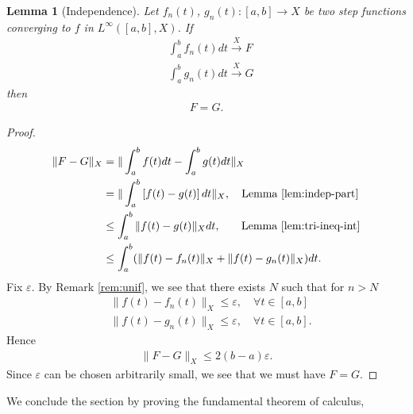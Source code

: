 \documentclass[12pt,reqno]{amsart}
\numberwithin{equation}{section}  %
\numberwithin{figure}{section}
\newcommand{\ee}{\varepsilon}
\theoremstyle{plain}
\newtheorem{lemma}{Lemma}
\theoremstyle{definition}
\theoremstyle{remark}
\begin{document}
%
%
\begin{lemma}[Independence]
  Let $f_{n}(t)$, $g_{n}(t) : [a,b] \to X$
  be two step functions converging to $f$ in $L^{\infty}([a,b], X)$.
  If
  \begin{equation*}
  \begin{split}
    & \int_{a}^{b} f_{n}(t) dt \xrightarrow{X} F
    \\
    & \int_{a}^{b} g_{n}(t) dt \xrightarrow{X} G
  \end{split}
  \end{equation*}
  then
  \begin{equation*}
  \begin{split}
    F =G.
  \end{split}
  \end{equation*}
\label{lem:well-def}
\end{lemma}
%
%
%
%
%
%
\begin{proof}
%
%
\begin{equation*}
\begin{split}
  \| F - G \|_{X} & = \| \int_{a}^{b} f(t) dt - \int_{a}^{b} g(t) dt \|_{X}
  \\
  & = \| \int_{a}^{b}\left[ f(t) - g(t) \right]dt \|_{X}, \quad \text{Lemma
  \ref{lem:indep-part}}
  \\
  & \le \int_{a}^{b} \| f(t) - g(t) \|_{X} dt,
  \quad \phantom{m} \text{Lemma \ref{lem:tri-ineq-int}}
  \\
  & \le \int_{a}^{b} (\| f(t) - f_{n}(t) \|_{X} + \| f(t) - g_{n}(t) \|_{X})dt.
\end{split}
\end{equation*}
%
%
Fix $\ee$. By Remark \ref{rem:unif}, we see that there exists $N$ such
that for $n > N$
%
%
\begin{equation*}
\begin{split}
& \| f(t) - f_{n}(t) \|_{X} \le \ee, \quad \forall t \in [a, b]
\\
& \| f(t) - g_{n}(t) \|_{X} \le \ee, \quad \forall t \in [a, b].
\end{split}
\end{equation*}
%
%
Hence
%
%
\begin{equation*}
\begin{split}
\| F - G \|_{X} \le 2(b-a) \ee.
\end{split}
\end{equation*}
%
%
Since $\ee$ can be chosen arbitrarily small, we see that we must have $F = G$.
\end{proof}
%
%
We conclude the section by proving the fundamental theorem of calculus, 
\end{document}
